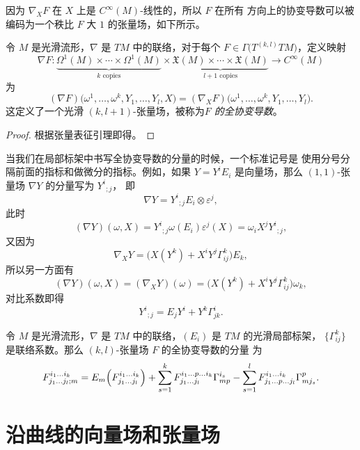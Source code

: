 因为 $\nabla_XF$ 在 $X$ 上是 $C^\infty(M)$-线性的，所以 $F$ 在所有
方向上的协变导数可以被编码为一个秩比 $F$ 大 $1$ 的张量场，如下所示。

\begin{proposition}[全协变导数]
  令 $M$ 是光滑流形，$\nabla$ 是 $TM$ 中的联络，对于每个
  $F\in\Gamma\bigl(T^{(k,l)}TM\bigr)$，定义映射
  \[
    \nabla F:\underbrace{\Omega^1(M)\times\cdots\times\Omega^1(M)}_{\text{$k$ copies}}
    \times \underbrace{\mathfrak{X}(M)\times\cdots\times \mathfrak{X}(M)}_{\text{$l+1$ copies}}
    \to C^\infty(M)
  \]
  为
  \begin{equation}
    (\nabla F)\bigl(\omega^1,\dots,\omega^k,Y_1,\dots,Y_l,X\bigr)
    =(\nabla_XF)\bigl(\omega^1,\dots,\omega^k,Y_1,\dots,Y_l\bigr).
  \end{equation}
  这定义了一个光滑 $(k,l+1)$-张量场，被称为\emph{$F$ 的全协变导数}。
\end{proposition}
\begin{proof}
  根据张量表征引理即得。
\end{proof}

当我们在局部标架中书写全协变导数的分量的时候，一个标准记号是
使用分号分隔前面的指标和做微分的指标。例如，如果 $Y=Y^iE_i$
是向量场，那么 $(1,1)$-张量场 $\nabla Y$ 的分量写为 ${Y^i}_{;j}$，
即
\[
  \nabla Y=  {Y^i}_{;j}E_i\otimes \varepsilon^j,
\]
此时
\[
  (\nabla Y)(\omega,X)={Y^i}_{;j} \omega(E_i)\varepsilon^j(X)
  =\omega_i X^j{Y^i}_{;j},  
\]
又因为
\[
  \nabla_XY=\bigl(X(Y^k)+X^iY^j\Gamma_{ij}^k\bigr)  E_k,
\]
所以另一方面有
\[  
  (\nabla Y)(\omega,X)=(\nabla_XY)(\omega)=
  \bigl(X(Y^k)+X^iY^j\Gamma_{ij}^k\bigr)\omega_k,
\]
对比系数即得
\[
  {Y^i}_{;j}=E_jY^i+Y^k\Gamma_{jk}^i.  
\]

\begin{proposition}\label{prop:components of total convariant derivative}
  令 $M$ 是光滑流形，$\nabla$ 是 $TM$ 中的联络，$(E_i)$ 是 $TM$ 的光滑局部标架，
  $\{\Gamma_{ij}^k\}$ 是联络系数。那么 $(k,l)$-张量场 $F$ 的全协变导数的分量
  为
  \[
    F_{j_1\dots j_l;m}^{i_1\dots i_k}  =
    E_m\Bigl(F_{j_1\dots j_l}^{i_1\dots i_k}\Bigr)
    +\sum_{s=1}^k F_{j_1\dots j_l}^{i_1\dots p\dots i_k}\Gamma_{mp}^{i_s}
    -\sum_{s=1}^l F_{j_1\dots p\dots j_l}^{i_1\dots i_k}\Gamma_{m j_s}^p.
  \]
\end{proposition}



\section{沿曲线的向量场和张量场}


